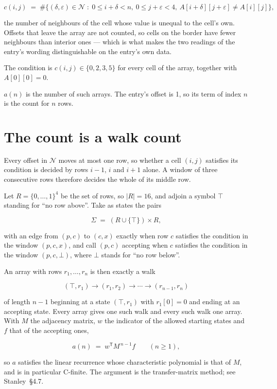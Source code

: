 \documentclass[11pt]{article}
\theoremstyle{definition}
\begin{document}
\[c(i,j) \;=\; \#\bigl\{(\delta,\varepsilon)\in\mathcal{N} \;:\; 0\le i+\delta<n,\ 0\le j+\varepsilon<4,\ A[i+\delta][j+\varepsilon] \neq A[i][j]\bigr\},\]

the number of neighbours of the cell whose value is unequal to the cell's own. Offsets that leave the array are not counted, so cells on the border have fewer neighbours than interior ones --- which is what makes the two readings of the entry's wording distinguishable on the entry's own data.

The condition is $c(i,j) \in \{0, 2, 3, 5\}$ for every cell of the array, together with $A[0][0]=0$.

$a(n)$ is the number of such arrays. The entry's offset is 1, so its term of index $n$ is the count for $n$ rows.

\section{The count is a walk count}

Every offset in $\mathcal{N}$ moves at most one row, so whether a cell $(i,j)$ satisfies its condition is decided by rows $i-1$, $i$ and $i+1$ alone. A window of three consecutive rows therefore decides the whole of its middle row.

Let $R = \{0,\dots,1\}^{4}$ be the set of rows, so $|R| = 16$, and adjoin a symbol $\top$ standing for ``no row above''. Take as states the pairs

\[\Sigma \;=\; (R \cup \{\top\}) \times R,\]

with an edge from $(p,c)$ to $(c,x)$ exactly when row $c$ satisfies the condition in the window $(p,c,x)$, and call $(p,c)$ accepting when $c$ satisfies the condition in the window $(p,c,\bot)$, where $\bot$ stands for ``no row below''.

An array with rows $r_1,\dots,r_n$ is then exactly a walk

\[(\top,r_1) \to (r_1,r_2) \to \cdots \to (r_{n-1},r_n)\]

of length $n-1$ beginning at a state $(\top,r_1)$ with $r_1[0]=0$ and ending at an accepting state. Every array gives one such walk and every such walk one array. With $M$ the adjacency matrix, $w$ the indicator of the allowed starting states and $f$ that of the accepting ones,

\[a(n) \;=\; w^{\mathsf T} M^{\,n-1} f \qquad (n \ge 1),\]

so $a$ satisfies the linear recurrence whose characteristic polynomial is that of $M$, and is in particular C-finite. The argument is the transfer-matrix method; see Stanley~\S4.7.
\end{document}
